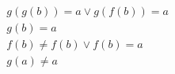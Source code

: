 \begin{align*}
%
& g(g(b)) = a \lor g(f(b)) = a
~\\~
& g(b) = a
~\\~
& f(b)  \neq  f(b) \lor f(b) = a
~\\~
& g(a)  \neq  a
%
\end{align*}
